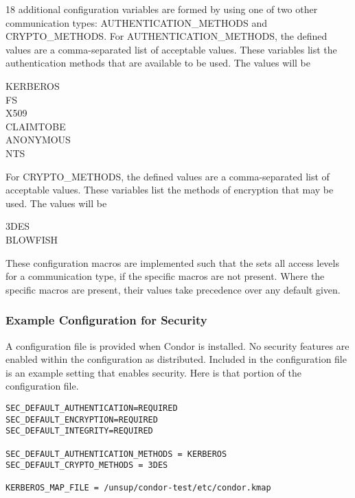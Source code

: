 18 additional configuration variables are formed by using one
of two other communication types:
AUTHENTICATION\_METHODS and
CRYPTO\_METHODS.
For AUTHENTICATION\_METHODS,
the defined values are a comma-separated list of acceptable values.
These variables list the authentication methods that are available
to be used.
The values will be 
\begin{description}
    \item[KERBEROS]
    \item[FS]
    \item[X509]
    \item[CLAIMTOBE]
    \item[ANONYMOUS]
    \item[NTS]
\end{description}

For CRYPTO\_METHODS,
the defined values are a comma-separated list of acceptable values.
These variables list the methods of encryption that may be used.
The values will be 
\begin{description}
    \item[3DES]
    \item[BLOWFISH]
\end{description}

These configuration macros are implemented such that the
 sets all access levels for a
communication type, if the specific macros are not present.
Where the specific macros are present, their values take
precedence over any default given.

\subsubsection{\label{sec:Security-sample} Example Configuration for Security}

A configuration file is provided when Condor is installed.
No security features are enabled within the configuration as
distributed.
Included in the configuration file is an example setting
that enables security.
Here is that portion of the configuration file.

\begin{verbatim}
SEC_DEFAULT_AUTHENTICATION=REQUIRED
SEC_DEFAULT_ENCRYPTION=REQUIRED
SEC_DEFAULT_INTEGRITY=REQUIRED

SEC_DEFAULT_AUTHENTICATION_METHODS = KERBEROS
SEC_DEFAULT_CRYPTO_METHODS = 3DES

KERBEROS_MAP_FILE = /unsup/condor-test/etc/condor.kmap

\end{verbatim}

